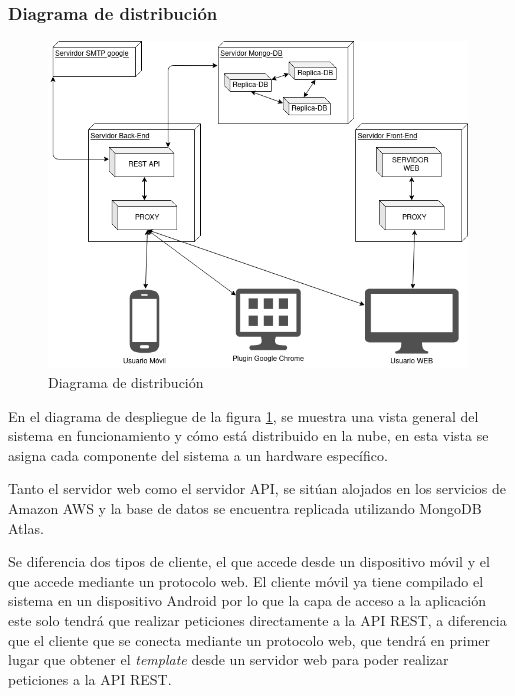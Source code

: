 \documentclass{article}
\begin{document}
 
\subsubsection*{Diagrama de distribución}
 
\begin{figure}[H]
   \centering
       \includegraphics[width=0.99\textwidth]{../images/despliegue2.png}
   \caption{Diagrama de distribución}
   \label{despliegue}
\end{figure}
 
En el diagrama de despliegue de la figura \ref{despliegue}, se muestra una vista general del sistema en funcionamiento y cómo está distribuido en la nube, en esta vista se asigna cada componente del sistema a un hardware específico.
 
Tanto el servidor web como el servidor API, se sitúan alojados en los servicios de Amazon AWS y la base de datos se encuentra replicada utilizando MongoDB Atlas.
 
Se diferencia dos tipos de cliente, el que accede desde un dispositivo móvil y el que accede mediante un protocolo web. El cliente móvil ya tiene compilado el sistema en un dispositivo Android por lo que la capa de acceso a la aplicación este solo tendrá que realizar peticiones directamente a la API REST, a diferencia que el cliente que se conecta mediante un protocolo web, que tendrá en primer lugar que obtener el \textit{template} desde un servidor web para poder realizar peticiones a la API REST.
 
\end{document}
